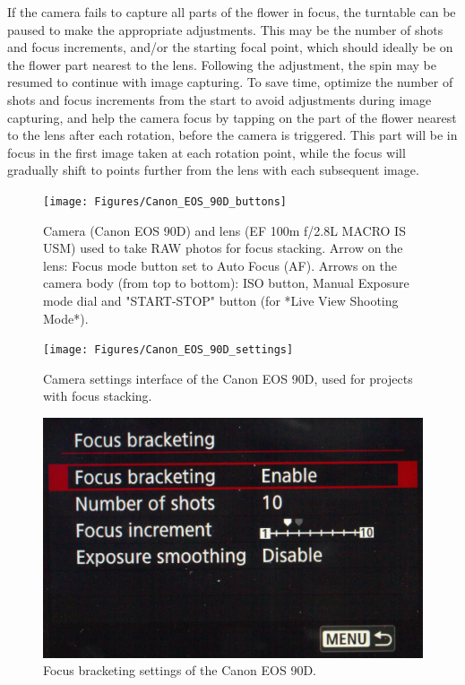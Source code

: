 \documentclass[
]{book}
\begin{document}
If the camera fails to capture all parts of the flower in focus, the turntable can be paused to make the appropriate adjustments. This may be the number of shots and focus increments, and/or the starting focal point, which should ideally be on the flower part nearest to the lens. Following the adjustment, the spin may be resumed to continue with image capturing. To save time, optimize the number of shots and focus increments from the start to avoid adjustments during image capturing, and help the camera focus by tapping on the part of the flower nearest to the lens after each rotation, before the camera is triggered. This part will be in focus in the first image taken at each rotation point, while the focus will gradually shift to points further from the lens with each subsequent image.

\begin{figure}

{\centering \texttt{[image: Figures/Canon\_EOS\_90D\_buttons]} 

}

\caption{Camera (Canon EOS 90D) and lens (EF 100m f/2.8L MACRO IS USM) used to take RAW photos for focus stacking. Arrow on the lens: Focus mode button set to Auto Focus (AF). Arrows on the camera body (from top to bottom): ISO button, Manual Exposure mode dial and "START-STOP" button (for *Live View Shooting Mode*).}\label{fig:camera-arrows-FS}
\end{figure}

\begin{figure}

{\centering \texttt{[image: Figures/Canon\_EOS\_90D\_settings]} 

}

\caption{Camera settings interface of the Canon EOS 90D, used for projects with focus stacking.}\label{fig:camera-settings-FS}
\end{figure}

\begin{figure}

{\centering \includegraphics[width=0.5\linewidth]{Figures/Focus_bracketing_settings} 

}

\caption{Focus bracketing settings of the Canon EOS 90D.}\label{fig:focus-stacking-settings}
\end{figure}
\end{document}
